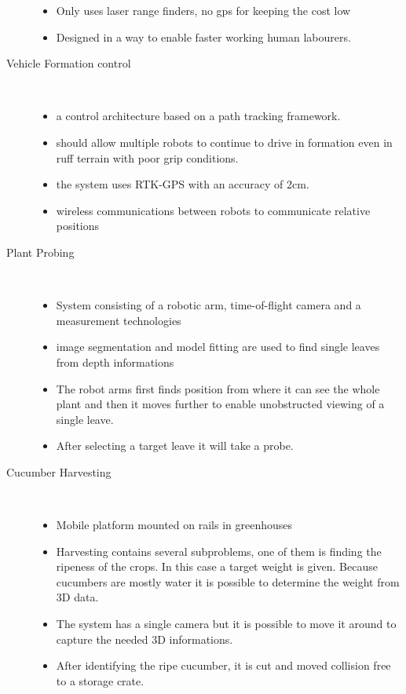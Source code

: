 \begin{description}
\begin{itemize}
        \item Only uses laser range finders, no gps for keeping the cost low
        \item Designed in a way to enable faster working human labourers.
    \end{itemize} 
    \item[Vehicle Formation control] \
    \begin{itemize}
        \item a control architecture based on a path tracking framework. 
        \item should allow multiple robots to continue to drive in formation even in ruff terrain with poor grip conditions.
        \item the system uses RTK-GPS with an accuracy of 2cm.
        \item wireless communications between robots to communicate relative positions
    \end{itemize} 
    \item[Plant Probing] \
    \begin{itemize}
        \item System consisting of a robotic arm, time-of-flight camera and a measurement technologies
        \item image segmentation and model fitting are used to find single leaves from depth informations
        \item The robot arms first finds position from where it can see the whole plant and then it moves further to enable unobstructed viewing of a single leave.
        \item After selecting a target leave it will take a probe.
    \end{itemize} 
    \item[Cucumber Harvesting] \
    \begin{itemize}
        \item Mobile platform mounted on rails in greenhouses
        \item Harvesting contains several subproblems, one of them is finding the ripeness of the crops. In this case a target weight is given. Because cucumbers are mostly water it is possible to determine the weight from 3D data.
        \item The system has a single camera but it is possible to move it around to capture the needed 3D informations.
        \item After identifying the ripe cucumber, it is cut and moved collision free to a storage crate. 
    \end{itemize} 

\end{description} 
